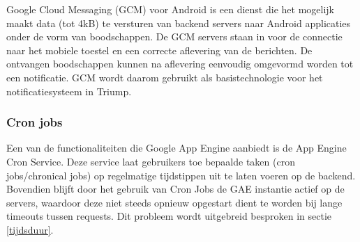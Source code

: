 Google Cloud Messaging (GCM) voor Android is een dienst die het mogelijk maakt data (tot 4kB) te versturen van backend servers naar Android applicaties onder de vorm van boodschappen. De GCM servers staan in voor de connectie naar het mobiele toestel en een correcte aflevering van de berichten. De ontvangen boodschappen kunnen na aflevering eenvoudig omgevormd worden tot een notificatie. GCM wordt daarom gebruikt als basistechnologie voor het notificatiesysteem in Triump.

\subsubsection{Cron jobs~\cite{Google_Cron_Jobs}}

Een van de functionaliteiten die Google App Engine aanbiedt is de App Engine Cron Service. Deze service laat gebruikers toe bepaalde taken (cron jobs/chronical jobs) op regelmatige tijdstippen uit te laten voeren op de backend. Bovendien blijft door het gebruik van Cron Jobs de GAE instantie actief op de servers, waardoor deze niet steeds opnieuw opgestart dient te worden bij lange timeouts tussen requests. Dit probleem wordt uitgebreid besproken in sectie \ref{tijdsduur}.


